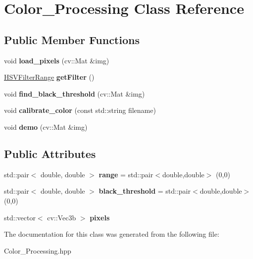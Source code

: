 \hypertarget{class_color___processing}{}\section{Color\+\_\+\+Processing Class Reference}
\label{class_color___processing}
\subsection*{Public Member Functions}
\begin{DoxyCompactItemize}
\item 
\mbox{\label{class_color___processing_a293f699a508b29f6a040f80363b5175c}} 
void {\bfseries load\+\_\+pixels} (cv\+::\+Mat \&img)
\item 
\mbox{\label{class_color___processing_a1b6c44ee9495d9d453545b57640be8cd}} 
\mbox{\hyperlink{struct_h_s_v_filter_range}{H\+S\+V\+Filter\+Range}} {\bfseries get\+Filter} ()
\item 
\mbox{\label{class_color___processing_aff93a009843ca7762732984ef57375b9}} 
void {\bfseries find\+\_\+black\+\_\+threshold} (cv\+::\+Mat \&img)
\item 
\mbox{\label{class_color___processing_acb962976dba3538eabcf5812951a023e}} 
void {\bfseries calibrate\+\_\+color} (const std\+::string filename)
\item 
\mbox{\label{class_color___processing_aa5007ebc7ce0250d5028ee718bace4d4}} 
void {\bfseries demo} (cv\+::\+Mat \&img)
\end{DoxyCompactItemize}
\subsection*{Public Attributes}
\begin{DoxyCompactItemize}
\item 
\mbox{\label{class_color___processing_a5769c226ab5a68929b0b5894d35dbb57}} 
std\+::pair$<$ double, double $>$ {\bfseries range} = std\+::pair$<$double,double$>$ (0,0)
\item 
\mbox{\label{class_color___processing_a46734d34d9efc70a1e15dcece2a2336e}} 
std\+::pair$<$ double, double $>$ {\bfseries black\+\_\+threshold} = std\+::pair$<$double,double$>$ (0,0)
\item 
\mbox{\label{class_color___processing_a8702c050fe8071a91a3d4376b76ac0d5}} 
std\+::vector$<$ cv\+::\+Vec3b $>$ {\bfseries pixels}
\end{DoxyCompactItemize}


The documentation for this class was generated from the following file\+:\begin{DoxyCompactItemize}
\item 
Color\+\_\+\+Processing.\+hpp\end{DoxyCompactItemize}
